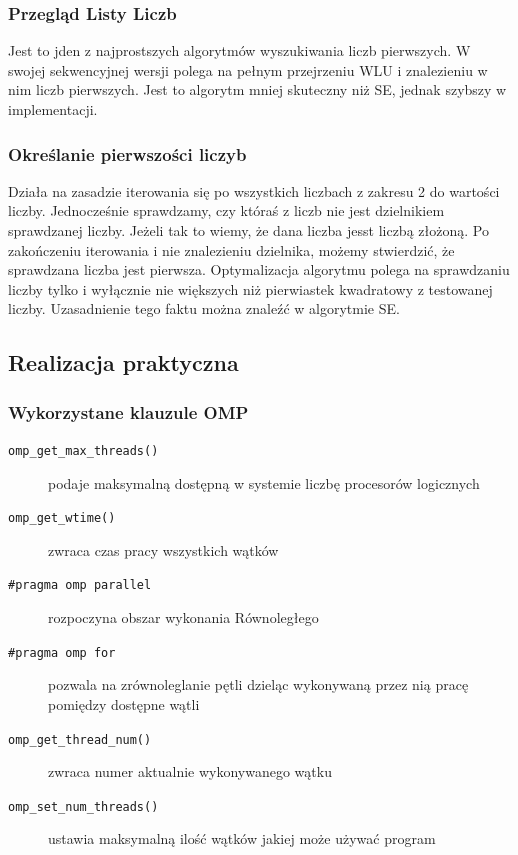 \documentclass{article}
\begin{document}
            \subsubsection{Przegląd Listy Liczb}
                Jest to jden z najprostszych algorytmów wyszukiwania liczb pierwszych. W swojej sekwencyjnej wersji polega na pełnym przejrzeniu \gls{WLU} i znalezieniu w nim liczb pierwszych. Jest to algorytm mniej skuteczny niż \gls{SE}, jednak szybszy w implementacji.
                
            \subsubsection{Określanie pierwszości liczyb}
                Działa na zasadzie iterowania się po wszystkich liczbach z zakresu 2 do wartości liczby. Jednocześnie sprawdzamy, czy któraś z liczb nie jest dzielnikiem sprawdzanej liczby. Jeżeli tak to wiemy, że dana liczba jesst liczbą złożoną. Po zakończeniu iterowania i nie znalezieniu dzielnika, możemy stwierdzić, że sprawdzana liczba jest pierwsza. Optymalizacja algorytmu polega na sprawdzaniu liczby tylko i wyłącznie nie większych niż pierwiastek kwadratowy z testowanej liczby. Uzasadnienie tego faktu można znaleźć w algorytmie \gls{SE}.
        \subsection{Realizacja praktyczna}
            \subsubsection{Wykorzystane klauzule OMP}
                \begin{description}
                    \item[\texttt{omp\_get\_max\_threads()}] podaje maksymalną dostępną w systemie liczbę procesorów logicznych
                    \item[\texttt{omp\_get\_wtime()}] zwraca czas pracy wszystkich wątków
                    \item[\texttt{\#pragma\ omp\ parallel}] rozpoczyna obszar wykonania Równoległego
                    \item[\texttt{\#pragma\ omp\ for}] pozwala na zrównoleglanie pętli dzieląc wykonywaną przez nią pracę pomiędzy dostępne wątli 
                    \item[\texttt{omp\_get\_thread\_num()}] zwraca numer aktualnie wykonywanego wątku
                    \item[\texttt{omp\_set\_num\_threads()}] ustawia maksymalną ilość wątków jakiej może używać program
                    \item[]   
                \end{description}
\end{document}
